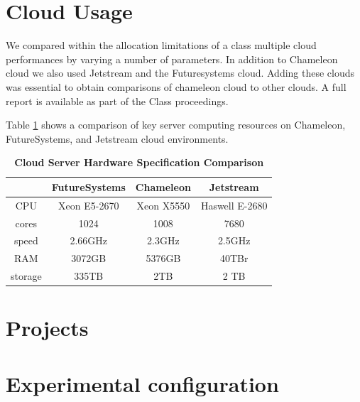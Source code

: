 \documentclass[sigconf]{acmart}
\begin{document}
\section{Cloud Usage}

We compared within the allocation limitations of a class multiple
cloud performances by varying a number of parameters.  In addition to
Chameleon cloud we also used Jetstream and the Futuresystems
cloud. Adding these clouds was essential to obtain comparisons of
chameleon cloud to other clouds.  A full report is available as part
of the Class proceedings.

Table \ref{tab:cloud-comparison} shows a comparison of key server computing
resources on Chameleon, FutureSystems, and Jetstream cloud
environments.

\begin{table}[htbp]
\centering
\caption{\bf Cloud Server Hardware Specification Comparison \cite{www-chamHardware} \cite{www-kiloHardware} \cite{www-jetHardware}}

 \begin{tabular} {| c | c | c | c |}
\hline
  & FutureSystems &  Chameleon  & Jetstream \\ [0.5ex] 
 \hline

    
CPU     &     Xeon E5-2670 & Xeon X5550 & Haswell E-2680  \\
 \hline
cores &  1024             &        1008   &  7680 \\
 \hline
speed     &   2.66GHz           &               2.3GHz & 2.5GHz\\
 \hline
RAM   &     3072GB            &               5376GB  &  40TBr\\
 \hline
storage     &     335TB     &                   2TB  & 2 TB\\ [1ex] 
 \hline

\end{tabular}
  \label{tab:cloud-comparison}
\end{table}


\section{Projects}


\section{Experimental configuration}
\end{document}
